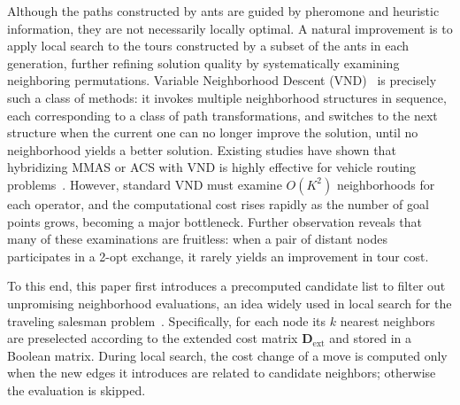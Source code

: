 \documentclass[lettersize,journal]{IEEEtran}
\begin{document}
Although the paths constructed by ants are guided by pheromone and heuristic information, they are not necessarily locally optimal. A natural improvement is to apply local search to the tours constructed by a subset of the ants in each generation, further refining solution quality by systematically examining neighboring permutations. Variable Neighborhood Descent (VND)~\textcolor{blue}{\cite{ref24}} is precisely such a class of methods: it invokes multiple neighborhood structures in sequence, each corresponding to a class of path transformations, and switches to the next structure when the current one can no longer improve the solution, until no neighborhood yields a better solution. Existing studies have shown that hybridizing MMAS or ACS with VND is highly effective for vehicle routing problems~\textcolor{blue}{\cite{ref25}}. However, standard VND must examine $O(K^2)$ neighborhoods for each operator, and the computational cost rises rapidly as the number of goal points grows, becoming a major bottleneck. Further observation reveals that many of these examinations are fruitless: when a pair of distant nodes participates in a 2-opt exchange, it rarely yields an improvement in tour cost.

To this end, this paper first introduces a precomputed candidate list to filter out unpromising neighborhood evaluations, an idea widely used in local search for the traveling salesman problem~\textcolor{blue}{\cite{ref26}}. Specifically, for each node its $k$ nearest neighbors are preselected according to the extended cost matrix $\mathbf{D}_{\mathrm{ext}}$ and stored in a Boolean matrix. During local search, the cost change of a move is computed only when the new edges it introduces are related to candidate neighbors; otherwise the evaluation is skipped.
\end{document}

